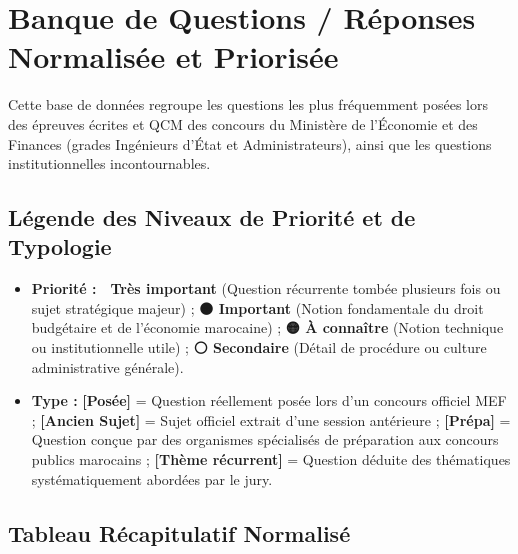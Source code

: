 \chapter{Banque de Questions / Réponses Normalisée et Priorisée}

Cette base de données regroupe les questions les plus fréquemment posées lors des épreuves écrites et QCM des concours du Ministère de l'Économie et des Finances (grades Ingénieurs d'État et Administrateurs), ainsi que les questions institutionnelles incontournables.

\section*{Légende des Niveaux de Priorité et de Typologie}
\begin{itemize}
    \item \textbf{Priorité :} 
    \textbf{🔴 Très important} (Question récurrente tombée plusieurs fois ou sujet stratégique majeur) ; 
    \textbf{🟠 Important} (Notion fondamentale du droit budgétaire et de l'économie marocaine) ; 
    \textbf{🟡 À connaître} (Notion technique ou institutionnelle utile) ; 
    \textbf{⚪ Secondaire} (Détail de procédure ou culture administrative générale).
    \item \textbf{Type :} 
    \textbf{[Posée]} = Question réellement posée lors d'un concours officiel MEF ; 
    \textbf{[Ancien Sujet]} = Sujet officiel extrait d'une session antérieure ; 
    \textbf{[Prépa]} = Question conçue par des organismes spécialisés de préparation aux concours publics marocains ; 
    \textbf{[Thème récurrent]} = Question déduite des thématiques systématiquement abordées par le jury.
\end{itemize}

\section{Tableau Récapitulatif Normalisé}

